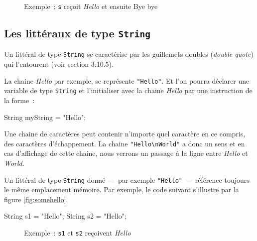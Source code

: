 \begin{figure}[h]
	\centering
	\caption{Exemple : \texttt{s} reçoit \textit{Hello} et ensuite {Bye bye}}
	\label{fig:hellobyebye}
\end{figure}



\subsection{Les littéraux de type \texttt{String}}

Un littéral de type \texttt{String} se caractérise par les guillemets doubles
(\textit{double quote}) qui l'entourent (voir \cite{jls9} section 3.10.5). 

La chaine \textit{Hello} par exemple, se représente \texttt{"Hello"}. Et l'on
pourra déclarer une variable de type \texttt{String} et l'initialiser avec la
chaine \textit{Hello} par une instruction de la forme~:

\begin{java}
	String myString = "Hello";
\end{java}

Une chaine de caractères peut contenir n'importe quel caractère en ce compris,
des caractères d'échappement. La chaine \texttt{"Hello\textbackslash nWorld"}
a donc un sens et en cas d'affichage de cette chaine, nous verrons un passage
à la ligne entre \textit{Hello} et \textit{World}.  

Un littéral de type \texttt{String} donné —~par exemple
\texttt{"Hello"}~— référence toujours le même emplacement mémoire. Par exemple,
le code suivant s'illustre par la figure \vref{fig:somehello}. 

\begin{java}
	String s1 = "Hello";
	String s2 = "Hello";
\end{java}

\begin{figure}[h]
	\centering
	\caption{Exemple : \texttt{s1} et \texttt{s2} reçoivent \textit{Hello}}
	\label{fig:somehello}
\end{figure}

